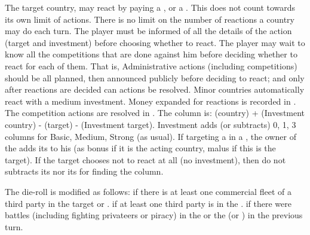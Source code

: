 \aparag[Reaction] The target country, may react by paying a ,  or a .
\bparag This does not count towards its own limit of actions. There is no
limit on the number of reactions a country may do each turn.
\bparag The player must be informed of all the details of the action (target
and investment) before choosing whether to react. The player may wait to know
all the competitions that are done against him before deciding whether to
react for each of them. That is, Administrative actions (including
competitions) should be all planned, then announced publicly before deciding
to react; and only after reactions are decided can actions be resolved.
\bparag Minor countries automatically react with a medium investment.
\bparag Money expanded for reactions is recorded in
.
\aparag[Column] The competition actions are resolved in
. The column is: (\FTI country) +
(Investment country) - (\FTI target) - (Investment target).
\bparag Investment adds (or subtracts) 0, 1, 3 columns for Basic, Medium,
Strong (as usual).
\bparag If targeting a \TradeFLEET in a \CTZ, the owner of the \CTZ adds its
\DTI to his \FTI (as bonus if it is the acting country, malus if this is the
target).
\bparag If the target chooses not to react at all (no investment), then do not
subtracts its \FTI nor its \DTI for finding the column.


\aparag[Modifiers] The die-roll is modified as follows:
 if there is at least one commercial fleet of a
third party in the target \STZ or \CTZ.
 if at least one third party \TP is in the \Area.
 if there were battles (including fighting privateers or
piracy) in the \Area or the \STZ (or \CTZ) in the previous turn.

